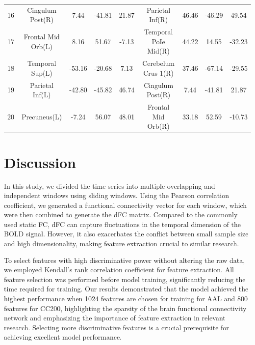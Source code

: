 \documentclass[journal,twoside,web]{ieeecolor}
\begin{document}
\begin{table}
\begin{tabular*}{\textwidth}{ccccccccc}
		16                           & Cingulum Post(R)                           & 7.44   & -41.81 & 21.87                               & Parietal Inf(R)                                     & 46.46  & -46.29 & 49.54                                              \\
		17                           & Frontal Mid Orb(L)                         & 8.16   & 51.67  & -7.13                               & Temporal PoIe Mid(R)                                & 44.22  & 14.55  & -32.23                                             \\
		18                           & Temporal Sup(L)                           & -53.16 & -20.68 & 7.13                                & Cerebelum Crus 1(R)                                 & 37.46  & -67.14 & -29.55                                             \\
		19                           & Parietal Inf(L)                            & -42.80 & -45.82 & 46.74                               & Cingulum Post(R)                                    & 7.44   & -41.81 & 21.87                                              \\
		20                           & Precuneus(L)                               & -7.24  & 56.07  & 48.01                               & Frontal Mid Orb(R)                                  & 33.18  & 52.59  & -10.73                                             \\
		\bottomrule
	\end{tabular*}
\end{table}
\vspace{0.1cm}
\section{Discussion}
In this study, we divided the time series into multiple overlapping and independent windows using sliding windows. Using the Pearson correlation coefficient, we generated a functional connectivity vector for each window, which were then combined to generate the dFC matrix. Compared to the commonly used static FC, dFC can capture fluctuations in the temporal dimension of the BOLD signal. However, it also exacerbates the conflict between small sample size and high dimensionality, making feature extraction crucial to similar research.

To select features with high discriminative power without altering the raw data, we employed Kendall's rank correlation coefficient for feature extraction. All feature selection was performed before model training, significantly reducing the time required for training. Our results demonstrated that the model achieved the highest performance when 1024 features are chosen for training for AAL and 800 features for CC200, highlighting the sparsity of the brain functional connectivity network and emphasizing the importance of feature extraction in relevant research. Selecting more discriminative features is a crucial prerequisite for achieving excellent model performance.
\end{document}
